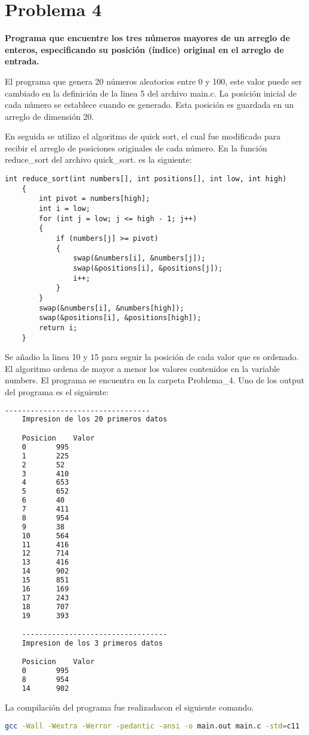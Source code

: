 \section*{Problema 4}

\textbf{Programa que encuentre los tres números mayores de un arreglo de enteros, especificando su posición (índice) original en el arreglo de entrada.}

El programa que genera 20 números aleatorios entre 0 y 100, este valor puede ser cambiado en la definición de la linea 5 del archivo \textcolor{citecolor}{main.c}. La posición inicial de cada número se establece cuando es generado. Esta posición es guardada en un arreglo de dimensión 20.

En seguida se utilizo el algoritmo de quick sort, el cual fue modificado para recibir el arreglo de posiciones originales de cada número. En la función \textcolor{title}{reduce\_sort} del archivo \textcolor{citecolor}{quick\_sort.} es la siguiente:

\begin{lstlisting}[style=CStyle]
    int reduce_sort(int numbers[], int positions[], int low, int high)
    {
        int pivot = numbers[high];
        int i = low;
        for (int j = low; j <= high - 1; j++)
        {
            if (numbers[j] >= pivot)
            {
                swap(&numbers[i], &numbers[j]);
                swap(&positions[i], &positions[j]);
                i++;
            }
        }
        swap(&numbers[i], &numbers[high]);
        swap(&positions[i], &positions[high]);
        return i;
    }
\end{lstlisting}

Se añadio la linea 10 y 15 para seguir la posición de cada valor que es ordenado. El algoritmo ordena de mayor a menor los valores contenidos en la variable numbers. El programa se encuentra en la carpeta \textcolor{citecolor}{Problema\_4}. Uno de los output del programa es el siguiente:

\begin{lstlisting}[language=bash]
    ----------------------------------
    Impresion de los 20 primeros datos

    Posicion	Valor
    0		995
    1		225
    2		52
    3		410
    4		653
    5		652
    6		40
    7		411
    8		954
    9		38
    10		564
    11		416
    12		714
    13		416
    14		902
    15		851
    16		169
    17		243
    18		707
    19		393

    ----------------------------------
    Impresion de los 3 primeros datos

    Posicion	Valor
    0		995
    8		954
    14		902
\end{lstlisting}


La compilación del programa fue realizadacon el siguiente comando.

\begin{lstlisting}[language=bash]
    gcc -Wall -Wextra -Werror -pedantic -ansi -o main.out main.c -std=c11
\end{lstlisting}